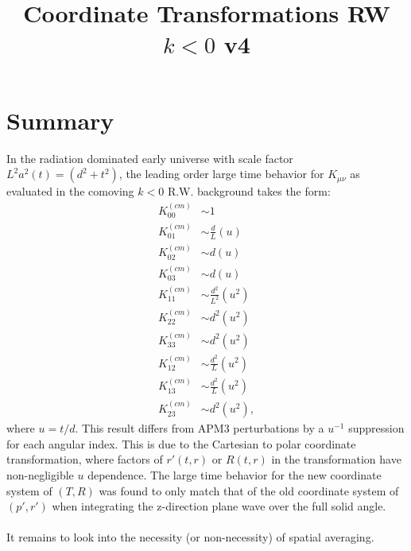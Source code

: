 \documentclass[10pt,letterpaper]{article}
\title{Coordinate Transformations RW $k<0$ v4 }
\date{}
\begin{document}
\maketitle
\noindent 
\section*{Summary}
In the radiation dominated early universe with scale factor $L^2 a^2(t) =(d^2+t^2)$, the leading order large time behavior for $K_{\mu\nu}$ as evaluated in the comoving $k<0$ R.W. background takes the form:
\begin{align}
K^{(cm)}_{00} &\sim 1 \nonumber\\
K^{(cm)}_{01} &\sim \frac{d}{L}(u) \nonumber\\
K^{(cm)}_{02} &\sim d(u) \nonumber\\
K^{(cm)}_{03} &\sim d(u) \nonumber\\
K^{(cm)}_{11} &\sim \frac{d^2}{L^2}(u^2) \nonumber\\
K^{(cm)}_{22} &\sim d^2(u^2) \nonumber\\
K^{(cm)}_{33} &\sim d^2(u^2) \nonumber\\
K^{(cm)}_{12} &\sim \frac{d^2}{L}(u^2) \nonumber\\
K^{(cm)}_{13} &\sim \frac{d^2}{L}(u^2) \nonumber\\
K^{(cm)}_{23} &\sim d^2(u^2),
\end{align}
where $u = t/d$. This result differs from APM3 perturbations by a $u^{-1}$ suppression for each angular index. This is due to the Cartesian to polar coordinate transformation, where factors of $r'(t,r)$ or $R(t,r)$ in the transformation have non-negligible $u$ dependence. The large time behavior for the new coordinate system of $(T,R)$ was found to only match that of the old coordinate system of $(p',r')$ when integrating the z-direction plane wave over the full solid angle. 
\\ \\
It remains to look into the necessity (or non-necessity) of spatial averaging. 
\end{document}
